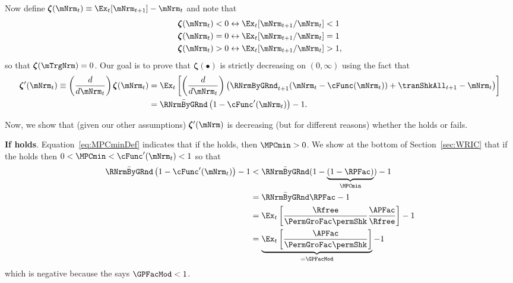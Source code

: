 \documentclass[\econtexRoot/BufferStockTheory]{subfiles}
\begin{document}
Now define \providecommand{\difFunc}{\pmb{\zeta}} $\difFunc(\mNrm_t) \equiv 
\Ex_t[\mNrm_{t+1}] - \mNrm_t$ and note that
\begin{align}\label{eq:difNrmioEquiv}
  \difFunc(\mNrm_t) < 0 &\leftrightarrow \Ex_t[{\mNrm}_{t+1}/\mNrm_t] < 1 
                          \nonumber\\
  \difFunc(\mNrm_t) = 0 &\leftrightarrow \Ex_t[{\mNrm}_{t+1}/\mNrm_t] = 1\\
  \difFunc(\mNrm_t) > 0 &\leftrightarrow \Ex_t[{\mNrm}_{t+1}/\mNrm_t] > 
                          1,\nonumber
\end{align}
so that $\difFunc(\mTrgNrm)=0$. Our goal is to prove that $\difFunc(\bullet)$ is strictly 
decreasing on $(0,\infty)$ using the fact that
\begin{align}
  \difFunc^{\prime}(\mNrm_{t}) \equiv  \left( \frac{d}{d\mNrm_{t}}\right) \difFunc(\mNrm_t)  & = \Ex_{t}\left[
                                                                                               \left( \frac{d}{d\mNrm_{t}}\right) \left( 
                                                                                               {\RNrmByGRnd}_{t+1}(\mNrm_{t}-\cFunc(\mNrm_{t}))+%
                                                                                               {\tranShkAll}_{t+1} - {\mNrm}_t\right) \right] \label{eq:difFuncmNrmDecreases} \\
                                                                                             & = \bar{\RNrmByGRnd}\left(1-\cFunc^{\prime}({\mNrm}_t)\right) - 1.  \notag
\end{align}

Now, we show that (given our other assumptions) $\difFunc^{\prime}(\mNrm)$ is decreasing (but for different reasons) whether the {\RIC} holds or fails.

\textbf{If {\RIC} holds}. Equation~\eqref{eq:MPCminDef} indicates that if the {\RIC} holds, then $\MPCmin >0$.  We show at the bottom of Section~\ref{sec:WRIC} that if the {\RIC} holds then $0 < \MPCmin < \cFunc^{\prime}(\mNrm_{t}) < 1$ so that 
\begin{align*}
  \bar{\RNrmByGRnd}\left(1-\cFunc^{\prime}({\mNrm}_t)\right) - 1 & <  \bar{\RNrmByGRnd}(1-\underbrace{(1-\RPFac)}_{\MPCmin}) - 1  \\
                                                            & = \bar{\RNrmByGRnd}\RPFac - 1 \\
                                                            & = \Ex_{t}\left[\frac{\Rfree}{\PermGroFac \permShk}\frac{\APFac}{\Rfree}\right] - 1 \\
                                                            & = \underbrace{\Ex_{t}\left[\frac{\APFac}{\PermGroFac \permShk}\right]}_{= \GPFacMod} - 1 
\end{align*}
which is negative because the {\GICMod} says $\GPFacMod < 1$.  
\end{document}
